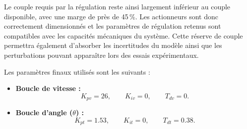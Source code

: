Le couple requis par la régulation reste ainsi largement inférieur au couple disponible, avec une marge de près de 45\,\%. Les actionneurs sont donc correctement dimensionnés et les paramètres de régulation retenus sont compatibles avec les capacités mécaniques du système. Cette réserve de couple permettra également d'absorber les incertitudes du modèle ainsi que les perturbations pouvant apparaître lors des essais expérimentaux.

Les paramètres finaux utilisés sont les suivants :

\begin{itemize}
    \item \textbf{Boucle de vitesse :}
    \[
    K_{pv}=26,\qquad
    K_{iv}=0,\qquad
    T_{dv}=0.
    \]

    \item \textbf{Boucle d'angle ($\theta$) :}
    \[
    K_{pt}=1.53,\qquad
    K_{it}=0,\qquad
    T_{dt}=0.38.
    \]
\end{itemize}